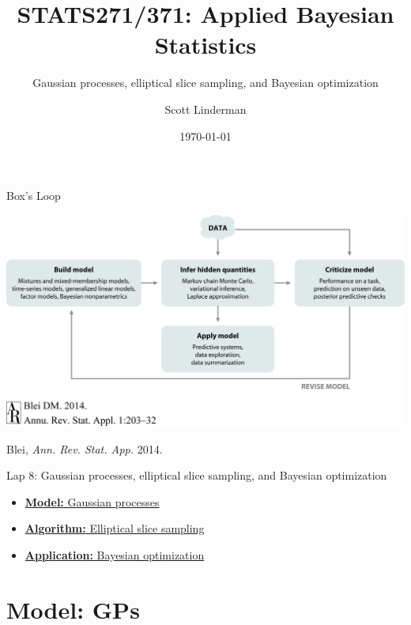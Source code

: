 \documentclass[aspectratio=169]{beamer}
\title{STATS271/371: Applied Bayesian Statistics}
\subtitle{Gaussian processes, elliptical slice sampling, and Bayesian optimization}
\author{Scott Linderman}
\date{\today}
\begin{document}
\maketitle

\begin{frame}{Box's Loop}
\begin{center}
\includegraphics[width=.85\linewidth]{figures/lap1/boxsloop.jpeg}\\
\end{center} 
\begin{flushright}
{\footnotesize Blei, \textit{Ann. Rev. Stat. App.} 2014.}
\end{flushright}
\end{frame}

\begin{frame}{Lap 8: Gaussian processes, elliptical slice sampling, and Bayesian optimization}
\begin{itemize}
    \item \hyperref[sec:gps]{\textbf{Model:} Gaussian processes}
    \item \hyperref[sec:ess]{\textbf{Algorithm:} Elliptical slice sampling}
    \item \hyperref[sec:bopt]{\textbf{Application:} Bayesian optimization}
\end{itemize}
\end{frame}

\section{Model: GPs}
\label{sec:gps}
\end{document}
